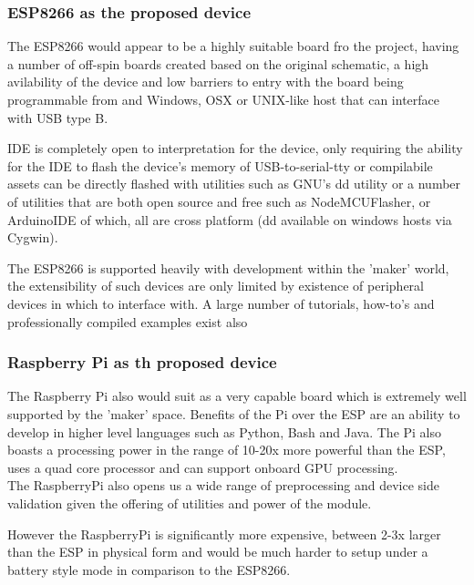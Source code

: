 \documentclass{article}
\begin{document}
        \subsubsection{ESP8266 as the proposed device}
        The ESP8266\cite{ESP8266} would appear to be a highly suitable board fro the project, having
        a number of off-spin boards created based on the original schematic, a high avilability of the
        device and low barriers to entry with the board being programmable from and Windows, OSX or UNIX-like
        host that can interface with USB type B.
        \par
        IDE is completely open to interpretation for the device, only requiring the ability for the IDE to flash
        the device's memory of USB-to-serial-tty or compilabile assets can be directly flashed with utilities such
        as GNU's dd utility or a number of utilities that are both open source and free such as NodeMCUFlasher\cite{NodeMCU}, or
        ArduinoIDE\cite{ArduinoIDE} of which, all are cross platform (dd available on windows hosts via Cygwin).
        \par
        The ESP8266\cite{ESP8266} is supported heavily with development within the 'maker' world, the extensibility
        of such devices are only limited by existence of peripheral devices in which to interface with.
        A large number of tutorials, how-to's and professionally compiled examples exist also\cite{ESP8266-How-To}

        \subsubsection{Raspberry Pi as th proposed device}
        The Raspberry Pi\cite{RaspberryPi} also would suit as a very capable board which is extremely well supported 
        by the 'maker' space. Benefits of the Pi over the ESP are an ability to develop in higher level languages
        such as Python, Bash and Java. The Pi also boasts a processing power in the range of 10-20x more powerful than the 
        ESP, uses a quad core processor and can support onboard GPU processing.
        \\
        The RaspberryPi also opens us a wide range of preprocessing and device side validation given the 
        offering of utilities and power of the module. 
        \par
        However the RaspberryPi is significantly more expensive, between 2-3x larger than the ESP in physical form
        and would be much harder to setup under a battery style mode in comparison to the ESP8266.
\end{document}
